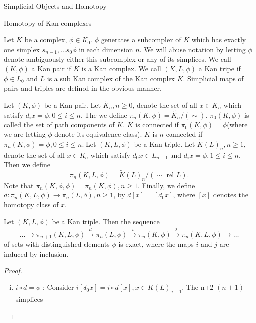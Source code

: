 \documentclass[a4,20pt,twosides]{book}
\begin{document}
\begin{chapter}{Simplicial Objects and Homotopy}
\begin{section}{Homotopy of Kan complexes}
	\begin{nota}
		Let $K$ be a complex, $\phi \in K_0$. $\phi$ generates a subcomplex of $K$ which has exactly one simplex $s_{n-1}, \dots s_0 \phi$ in each dimension $n$. We will abuse notation by letting $\phi$ denote ambiguously either this subcomplex or any of its simplices. We call $(K, \phi)$ a Kan pair if $K$ is a Kan complex. We call $(K, L, \phi)$ a Kan tripe if $\phi \in L_0$ and $L$ is a sub Kan complex of the Kan complex $K$. Simplicial maps of pairs and triples are defined in the obvious manner. 
	\end{nota}
	\begin{chdefn}
		Let $(K, \phi)$ be a Kan pair. Let $\tilde{K_n}, n \geq 0$, denote the set of all $x \in K_n$ which satisfy $d_i x = \phi, 0 \leq i \leq n$. The we define $\pi_n(K, \phi) = \tilde{K_n} \big/ (\sim)$. $\pi_0 (K, \phi)$ is called the set of path components of $K$. $K$ is connected if $\pi_0 (K, \phi) = \phi$(where we are letting $\phi$ denote its equivalence class). $K$ is $n$-connected if $\pi_n (K, \phi) = \phi, 0 \leq i \leq n$. Let $(K, L, \phi)$ be a Kan triple. Let $\tilde{K}(L)_n, n \geq 1$, denote the set of all $x \in K_n$ which satisfy $d_0 x \in L_{n-1}$ and $d_i x = \phi, 1 \leq i \leq n$. Then we define
		\[
		\pi_n (K, L, \phi) = \tilde{K}(L)_n \big/ (\sim \text{ rel }L ).
		\]
		Note that $\pi_n (K, \phi, \phi)= \pi_n (K, \phi), n \geq 1$. Finally, we define $d: \pi_n(K,L, \phi) \rightarrow \pi_n(L, \phi), n \geq 1$, by $d[x]=[d_0 x]$, where $[x]$ denotes the homotopy class of $x$.
	\end{chdefn}
	\begin{chthm}
		Let $(K, L, \phi)$ be a Kan triple. Then the sequence
		\[
		\dots \rightarrow \pi_{n+1}(K,L,\phi) \xrightarrow{d} \pi_{n}(L,\phi) \xrightarrow{i} \pi_{n}(K,\phi) \xrightarrow{j} \pi_{n}(K,L,\phi) \rightarrow \dots
		\]
		of sets with distinguished elements $\phi$ is exact, where the maps $i$ and $j$ are induced by inclusion.
	\end{chthm}
	\begin{proof}
		\begin{enumerate}[(i)] 
			\item $ i\circ d = \phi$ : Consider $i [d_0 x]= i \circ d[x], x \in K(L)_{n+1}$. The n+2 $(n+1)$-simplices
		\end{enumerate}
	\end{proof}
\end{section}
\end{chapter}
\end{document}
